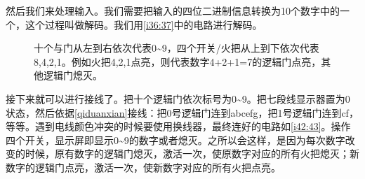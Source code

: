 然后我们来处理输入。我们需要把输入的四位二进制信息转换为10个数字中的一个，这个过程叫做解码。我们用\autoref{i36:37}中的电路进行解码。

\begin{figure}[!ht]
\begin{center}
\quad
{}
\end{center}
\caption{十个与门从左到右依次代表0\~{}9，四个开关/火把从上到下依次代表8,4,2,1。例如火把4,2,1点亮，则代表数字4+2+1=7的逻辑门点亮，其他逻辑门熄灭。}
\label{i36:37}
\end{figure}

接下来就可以进行接线了。把十个逻辑门依次标号为0\~{}9。把七段线显示器置为0状态，然后依据\autoref{qiduanxian}接线：把0号逻辑门连到abcefg，把1号逻辑门连到cf，等等。遇到电线颜色冲突的时候要使用换线器，最终连好的电路如\autoref{i42:43}。操作四个开关，显示屏即显示0\~{}9的数字或者熄灭。之所以会这样，是因为每次数字改变的时候，原有数字的逻辑门熄灭，激活一次，使原数字对应的所有火把熄灭；新数字的逻辑门点亮，激活一次，使新数字对应的所有火把点亮。

